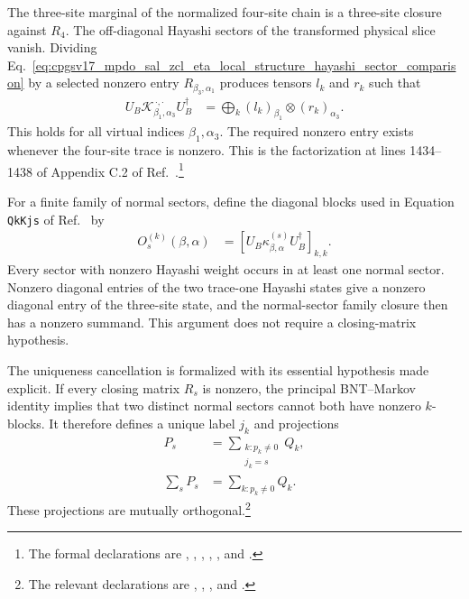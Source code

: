 \documentclass{article}
\begin{document}
The three-site marginal of the normalized four-site chain is a three-site
closure against $R_4$. The off-diagonal Hayashi sectors of the transformed
physical slice vanish. Dividing
Eq.~\ref{eq:cpgsv17_mpdo_sal_zcl_eta_local_structure_hayashi_sector_comparison}
by a selected nonzero entry $R_{\beta_3,\alpha_1}$ produces tensors $l_k$ and
$r_k$ such that
\begin{align}
    U_B
    \mathcal K^{\,\cdot,\cdot}_{\beta_1,\alpha_3}
    U_B^\dagger
        &=
        \bigoplus_k
        (l_k)_{\beta_1}\otimes(r_k)_{\alpha_3}.
    \label{eq:cpgsv17_mpdo_sal_zcl_eta_local_structure_physical_slice_factorization}
\end{align}
This holds for all virtual indices $\beta_1,\alpha_3$. The required nonzero
entry exists whenever the four-site trace is nonzero. This is the
factorization at lines 1434--1438 of Appendix C.2 of
Ref.~\cite{Cirac2016MPDO_arXiv}.\footnote{The formal declarations are
,
,
,
,
, and
.}

For a finite family of normal sectors, define the diagonal blocks used in
Equation \texttt{QkKjs} of Ref.~\cite{Cirac2016MPDO_arXiv} by
\begin{align}
    O_s^{(k)}(\beta,\alpha)
        &=
        \left[U_B\kappa^{(s)}_{\beta,\alpha}U_B^\dagger\right]_{k,k}.
    \label{eq:cpgsv17_mpdo_sal_zcl_eta_local_structure_normal_sector_block}
\end{align}
Every sector with nonzero Hayashi weight occurs in at least one normal sector.
Nonzero diagonal entries of the two trace-one Hayashi states give a nonzero
diagonal entry of the three-site state, and the normal-sector family closure
then has a nonzero summand. This argument does not require a closing-matrix
hypothesis.

The uniqueness cancellation is formalized with its essential hypothesis made
explicit. If every closing matrix $R_s$ is nonzero, the principal
BNT--Markov identity implies that two distinct normal sectors cannot both have
nonzero $k$-blocks. It therefore defines a unique label $j_k$ and projections
\begin{align}
    P_s
        &=
        \sum_{\substack{k:p_k\neq 0\\j_k=s}}Q_k,
    \label{eq:cpgsv17_mpdo_sal_zcl_eta_local_structure_bnt_projection}\\
    \sum_s P_s
        &=
        \sum_{k:p_k\neq 0}Q_k.
    \label{eq:cpgsv17_mpdo_sal_zcl_eta_local_structure_active_projection_resolution}
\end{align}
These projections are mutually orthogonal.\footnote{The relevant declarations
are
,
,
, and
.}
\end{document}
